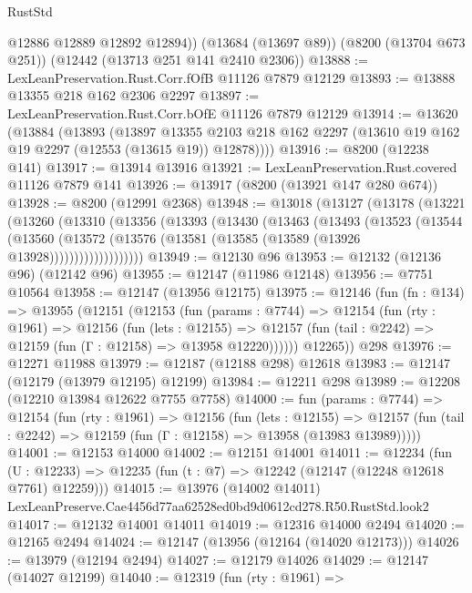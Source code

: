 \begin{lexlean}{RustStd}
\begin{coremodule}
        @12886
        @12889
        @12892
        @12894))
    (@13684 (@13697 @89))
    (@8200 (@13704 @673 @251))
    (@12442 (@13713 @251 @141 @2410 @2306))
@13888 := LexLeanPreservation.Rust.Corr.fOfB @11126 @7879 @12129
@13893 := @13888 @13355 @218 @162 @2306 @2297
@13897 := LexLeanPreservation.Rust.Corr.bOfE @11126 @7879 @12129
@13914 := @13620
    (@13884
      (@13893
        (@13897
          @13355
          @2103
          @218
          @162
          @2297
          (@13610 @19 @162 @19 @2297 (@12553 (@13615 @19)) @12878))))
@13916 := @8200 (@12238 @141)
@13917 := @13914 @13916
@13921 := LexLeanPreservation.Rust.covered @11126 @7879 @141
@13926 := @13917 (@8200 (@13921 @147 @280 @674))
@13928 := @8200 (@12991 @2368)
@13948 := @13018
    (@13127
      (@13178
        (@13221
          (@13260
            (@13310
              (@13356
                (@13393
                  (@13430
                    (@13463
                      (@13493
                        (@13523
                          (@13544
                            (@13560
                              (@13572
                                (@13576 (@13581 (@13585 (@13589 (@13926 @13928)))))))))))))))))))
@13949 := @12130 @96
@13953 := @12132 (@12136 @96) (@12142 @96)
@13955 := @12147 (@11986 @12148)
@13956 := @7751 @10564
@13958 := @12147 (@13956 @12175)
@13975 := @12146
    (fun (fn : @134) =>
    @13955
      (@12151
        (@12153
          (fun (params : @7744) =>
          @12154
            (fun (rty : @1961) =>
            @12156
              (fun (lets : @12155) =>
              @12157 (fun (tail : @2242) => @12159 (fun (Γ : @12158) => @13958 @12220))))))
        @12265))
    @298
@13976 := @12271 @11988
@13979 := @12187 (@12188 @298) @12618
@13983 := @12147 (@12179 (@13979 @12195) @12199)
@13984 := @12211 @298
@13989 := @12208 (@12210 @13984 @12622 @7755 @7758)
@14000 := fun (params : @7744) =>
  @12154
    (fun (rty : @1961) =>
    @12156
      (fun (lets : @12155) =>
      @12157 (fun (tail : @2242) => @12159 (fun (Γ : @12158) => @13958 (@13983 @13989)))))
@14001 := @12153 @14000
@14002 := @12151 @14001
@14011 := @12234
    (fun (U : @12233) => @12235 (fun (t : @7) => @12242 (@12147 (@12248 @12618 @7761) @12259)))
@14015 := @13976 (@14002 @14011) LexLeanPreserve.Cae4456d77aa62528ed0bd9d0612cd278.R50.RustStd.look2
@14017 := @12132 @14001 @14011
@14019 := @12316 @14000 @2494
@14020 := @12165 @2494
@14024 := @12147 (@13956 (@12164 (@14020 @12173)))
@14026 := @13979 (@12194 @2494)
@14027 := @12179 @14026
@14029 := @12147 (@14027 @12199)
@14040 := @12319
    (fun (rty : @1961) =>

\end{coremodule}
\end{lexlean}
